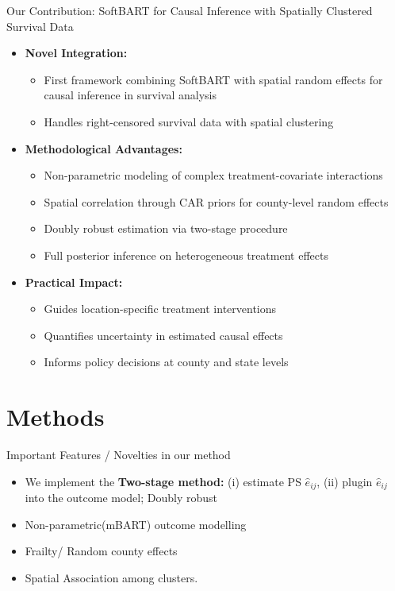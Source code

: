 \documentclass{beamer}
\begin{document}
\begin{frame}{Our Contribution: SoftBART for Causal Inference with Spatially Clustered Survival Data}
\begin{itemize}
    \item \textbf{Novel Integration:} 
    \begin{itemize}
        \item First framework combining SoftBART with spatial random effects for causal inference in survival analysis
        \item Handles right-censored survival data with spatial clustering
    \end{itemize}
    \item \textbf{Methodological Advantages:}
    \begin{itemize}
        \item Non-parametric modeling of complex treatment-covariate interactions
        \item Spatial correlation through CAR priors for county-level random effects
        \item Doubly robust estimation via two-stage procedure
        \item Full posterior inference on heterogeneous treatment effects
    \end{itemize}
    \item \textbf{Practical Impact:}
    \begin{itemize}
        \item Guides location-specific treatment interventions
        \item Quantifies uncertainty in estimated causal effects
        \item Informs policy decisions at county and state levels
    \end{itemize}
\end{itemize}
\end{frame}



\section{Methods}

\begin{frame}{Important Features / Novelties in our method}
\begin{itemize}
    \item We implement the \textbf{Two-stage method:} (i) estimate PS $\hat{e}_{ij}$, (ii) plugin $\hat{e}_{ij}$ into the outcome model; Doubly robust
    \item Non-parametric(mBART) outcome modelling
    \item Frailty/ Random county effects
    \item Spatial Association among clusters.
    
\end{itemize}
    
\end{frame}
\end{document}
